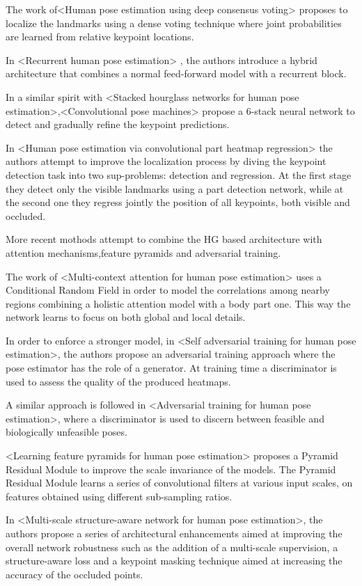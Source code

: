 \documentclass[11pt]{article}
\begin{document}
The work of<Human pose estimation using deep consensus voting> proposes to localize the landmarks using a dense voting technique where joint probabilities are learned from relative keypoint locations.

In <Recurrent human pose estimation> , the authors introduce a hybrid architecture that combines a normal feed-forward model with a recurrent block.

In a similar spirit with <Stacked hourglass networks for human pose estimation>,<Convolutional pose machines> propose a 6-stack neural network to detect and gradually refine the keypoint predictions.

In <Human pose estimation via convolutional part heatmap regression> the authors attempt to improve the localization process by diving the keypoint detection task into two sup-problems: detection and regression. At the first stage they detect only the visible landmarks using a part detection network, while at the second one they regress jointly the position of all keypoints, both visible and occluded.

More recent mothods attempt to combine the HG based architecture with attention mechanisms,feature pyramids and adversarial training.

The work of <Multi-context attention for human pose estimation> uses a Conditional Random Field in order to model the correlations among nearby regions combining a holistic attention model with a body part one. This way the network learns to focus on both global and local details.

In order to enforce a stronger model, in <Self adversarial training for human pose estimation>, the authors propose an adversarial training approach where the pose estimator has the role of a generator. At training time a discriminator is used to assess the quality of the produced heatmaps.

A similar approach is followed in <Adversarial training for human pose estimation>, where a discriminator is used to discern between feasible and biologically unfeasible poses.

<Learning feature pyramids for human pose estimation> proposes a Pyramid Residual Module to improve the scale invariance of the models. The Pyramid Residual Module learns a series of convolutional filters at various input scales, on features obtained using different sub-sampling ratios.

In <Multi-scale structure-aware network for human pose estimation>, the authors propose a series of architectural enhancements aimed at improving the overall network robustness such as the addition of a multi-scale supervision, a structure-aware loss and a keypoint masking technique aimed at increasing the accuracy of the occluded points.
\end{document}
